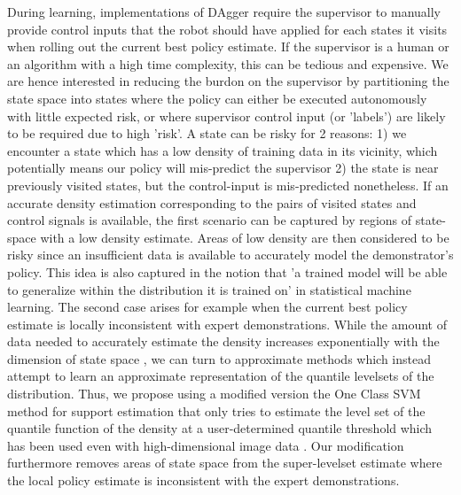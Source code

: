 \documentclass[10pt, conference]{ieeeconf}      %
\begin{document}
During learning, implementations of DAgger require the supervisor to manually provide control inputs that the robot
should have applied for each states it visits when rolling out the current best policy estimate. If the supervisor is a
human or an algorithm with a high time complexity, this can be tedious and expensive. We are hence interested in
reducing the burdon on the supervisor by partitioning the state space into states where the policy can either be
executed autonomously with little expected risk, or where supervisor control input (or 'labels') are likely to be
required due to high 'risk'. A state can be risky for 2 reasons: 1) we encounter a state which has a low density of
training data in its vicinity, which potentially means our policy will mis-predict the supervisor
\cite{tokdar2010importance} 2) the state is near previously visited states, but the control-input is mis-predicted
nonetheless. If an accurate density estimation corresponding to
the pairs of visited states and control signals is available, the first scenario can be captured by regions of
state-space with a low density estimate. Areas of low density are then considered to be risky since an insufficient data
is available to accurately model the demonstrator's policy. This idea is also captured in the notion that 'a trained
model will be able to generalize within the distribution it is trained on' \cite{tokdar2010importance} in statistical
machine learning. The second case arises for example when the current best policy estimate is locally inconsistent with expert
demonstrations.
%
%
While the amount of data needed to accurately estimate the density increases exponentially with the dimension of state
space \cite{nadaraya1964estimating}, we can turn to approximate methods which instead attempt to learn an approximate
representation of the quantile levelsets of the distribution. Thus, we propose using a modified version the One Class
SVM method for support estimation that only tries to estimate the level set of the quantile function of the density
\cite{scholkopf2001estimating} at a user-determined quantile threshold which has been used even with high-dimensional
image data \cite{liu2014unsupervised}. Our modification furthermore removes areas of state space from the super-levelset
estimate where the local policy estimate is inconsistent with the expert demonstrations.
\end{document}
